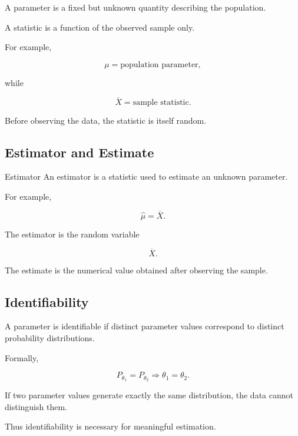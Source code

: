 A parameter is a fixed but unknown quantity describing the population.

A statistic is a function of the observed sample only.

For example,

\[
\boxed{
\mu
=
\text{population parameter},
}
\]

while

\[
\boxed{
\overline{X}
=
\text{sample statistic}.
}
\]

Before observing the data, the statistic is itself random.

\subsection{Estimator and Estimate}
\label{subsec:estimator-and-estimate}

\begin{definitionbox}{Estimator}
An estimator is a statistic used to estimate an unknown parameter.
\end{definitionbox}

For example,

\[
\boxed{
\widehat{\mu}
=
\overline{X}.
}
\]

The estimator is the random variable

\[
\overline{X}.
\]

The estimate is the numerical value obtained after observing the sample.

\subsection{Identifiability}
\label{subsec:statistical-identifiability}

A parameter is identifiable if distinct parameter values correspond to
distinct probability distributions.

Formally,

\[
\boxed{
P_{\theta_1}
=
P_{\theta_2}
\Longrightarrow
\theta_1=\theta_2.
}
\]

If two parameter values generate exactly the same distribution, the data
cannot distinguish them.

Thus identifiability is necessary for meaningful estimation.

